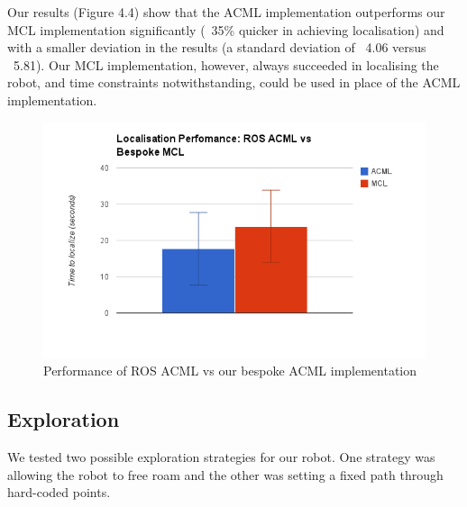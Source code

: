 \documentclass{article}
\begin{document}
Our results (Figure 4.4) show that the ACML implementation outperforms our MCL implementation significantly (~35\% quicker in achieving localisation) and with a smaller deviation in the results (a standard deviation of ~4.06 versus ~5.81). Our MCL implementation, however, always succeeded in localising the robot, and time constraints notwithstanding, could be used in place of the ACML implementation.
	\begin{figure}[H]
	\centering
	\includegraphics[width=\linewidth]{ExperimentalResults8}
	\caption{Performance of ROS ACML vs our bespoke ACML implementation}
	\end{figure}
	
	
	
	
	
	\subsection{Exploration}
	We tested two possible exploration strategies for our robot. One strategy was allowing the robot to free roam and the other was setting a fixed path through hard-coded points.\\
	
\end{document}

